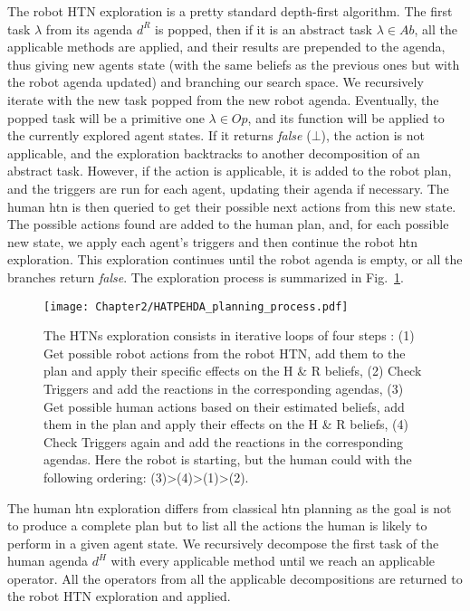 The robot HTN exploration is a pretty standard depth-first algorithm. The first task $\lambda$ from its agenda $d^R$ is popped, then if it is an abstract task $\lambda \in Ab$, all the applicable methods are applied, and their results are prepended to the agenda, thus giving new agents state (with the same beliefs as the previous ones but with the robot agenda updated) and branching our search space. We recursively iterate with the new task popped from the new robot agenda. Eventually, the popped task will be a primitive one $\lambda \in Op$, and its function will be applied to the currently explored agent states. If it returns \textit{false} ($\bot$), the action is not applicable, and the exploration backtracks to another decomposition of an abstract task. However, if the action is applicable, it is added to the robot plan, and the triggers are run for each agent, updating their agenda if necessary. The human \acrshort{htn} is then queried to get their possible next actions from this new state. The possible actions found are added to the human plan, and, for each possible new state, we apply each agent's triggers and then continue the robot \acrshort{htn} exploration. This exploration continues until the robot agenda is empty, or all the branches return \textit{false}. The exploration process is summarized in Fig.~\ref{fig:HATPEHDA_planning_process}.

\begin{figure}
    \centering
    \texttt{[image: Chapter2/HATPEHDA\_planning\_process.pdf]}
    \caption{The HTNs exploration consists in iterative loops of four steps : (1) Get possible robot actions from the robot HTN, add them to the plan and apply their specific effects on the H \& R beliefs, (2) Check Triggers and add the reactions in the corresponding agendas, (3) Get possible human actions based on their estimated beliefs, add them in the plan and apply their effects on the H \& R  beliefs, (4) Check Triggers again and add the reactions in the corresponding agendas. Here the robot is starting, but the human could with the following ordering: (3)>(4)>(1)>(2).}
    \label{fig:HATPEHDA_planning_process}
\end{figure}

The human \acrshort{htn} exploration differs from classical \acrshort{htn} planning as the goal is not to produce a complete plan but to list all the actions the human is likely to perform in a given agent state. 
We recursively decompose the first task of the human agenda $d^H$ with every applicable method until we reach an applicable operator. All the operators from all the applicable decompositions are returned to the robot HTN exploration and applied.

